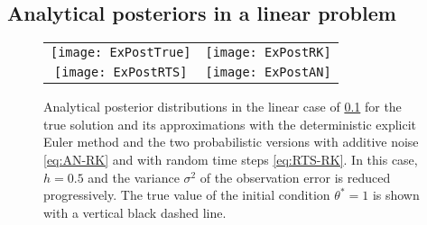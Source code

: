 \documentclass[10pt]{article}
\begin{document}
\subsection{Analytical posteriors in a linear problem}\label{sec:AnalyticalPosterior} 

\begin{figure}[t!]
	\begin{center}
		
		\vspace{0.2cm}
		\begin{tabular}{c@{\hskip 0.5in}c}
			\texttt{[image: ExPostTrue]} & \texttt{[image: ExPostRK]} \\[10pt] 
			\texttt{[image: ExPostRTS]}  & \texttt{[image: ExPostAN]}
		\end{tabular}	
	\end{center}
	\caption{Analytical posterior distributions in the linear case of \cref{sec:AnalyticalPosterior} for the true solution and its approximations with the deterministic explicit Euler method and the two probabilistic versions with additive noise \eqref{eq:AN-RK} and with random time steps \eqref{eq:RTS-RK}. In this case, $h = 0.5$ and the variance $\sigma^2$ of the observation error is reduced progressively. The true value of the initial condition $\theta^* = 1$ is shown with a vertical black dashed line.}
	\label{fig:AnalyticalPosterior}
\end{figure}
\end{document}
